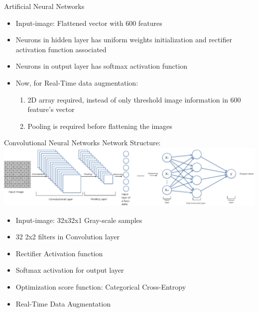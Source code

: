 \documentclass[10pt, a4paper]{beamer}
\begin{document}
\begin{frame}{Artificial Neural Networks}
\begin{itemize}
\item Input-image: Flattened vector with 600 features
\item Neurons in hidden layer has uniform weights initialization and rectifier activation function associated
\item Neurons in output layer has softmax activation function
\item Now, for Real-Time data augmentation:
  \begin{enumerate}
  \item 2D array required, instead of only threshold image information in 600 feature's vector
  \item Pooling is required before flattening the images 
  \end{enumerate}
\end{itemize}
\end{frame}

\begin{frame}{Convolutional Neural Networks}
Network Structure:\\
	\includegraphics[height=0.34 \textheight]{conv_explanation.png}
\begin{itemize}
\item Input-image: 32x32x1 Gray-scale samples
\item 32 2x2 filters in Convolution layer
\item Rectifier Activation function
\item Softmax activation for output layer
\item Optimization score function: Categorical Cross-Entropy
\item Real-Time Data Augmentation 
\end{itemize}

\end{frame}
\end{document}
